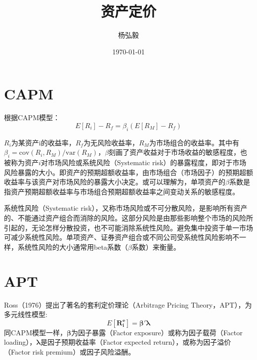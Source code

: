 \documentclass[11pt]{article}
\title{资产定价}
\author{杨弘毅}
\date{\today}
\begin{document}
\maketitle

\section{CAPM}
根据CAPM模型：
\begin{equation*}
    E[R_i] - R_f = \beta_i(E[R_M]-R_f)
\end{equation*}

$R_i$为某资产i的收益率，$R_f$为无风险收益率，$R_M$为市场组合的收益率。其中有$\beta_i = \text{cov}(R_i,R_M)/\text{var}(R_M)$，$\beta$刻画了资产收益对于市场收益的敏感程度，也被称为资产$i$对市场风险或系统风险（Systematic risk）的暴露程度，即对于市场风险暴露的大小。即资产的预期超额收益率，由市场组合（市场因子）的预期超额收益率与该资产对市场风险的暴露大小决定。或可以理解为，单项资产的$\beta$系数是指资产预期超额收益率与市场组合预期超额收益率之间变动关系的敏感程度。

系统性风险（Systematic risk），又称市场风险或不可分散风险，是影响所有资产的、不能通过资产组合而消除的风险。这部分风险是由那些影响整个市场的风险所引起的，无论怎样分散投资，也不可能消除系统性风险。避免集中投资于单一市场可减少系统性风险。单项资产、证券资产组合或不同公司受系统性风险影响不一样，系统性风险的大小通常用beta系数（$\beta$系数）来衡量。


\section{APT}
Ross（1976）提出了著名的套利定价理论（Arbitrage Pricing Theory，APT），为多元线性模型:
\begin{equation*}
    E[\bm{R_i^e}] = \bm{\beta' \lambda}
\end{equation*}
同CAPM模型一样，$\bm{\beta}$为因子暴露（Factor exposure）或称为因子载荷（Factor loading），$\bm{\lambda}$是因子预期收益率（Factor expected return），或称为因子溢价（Factor risk premium）或因子风险溢酬。
\end{document}
